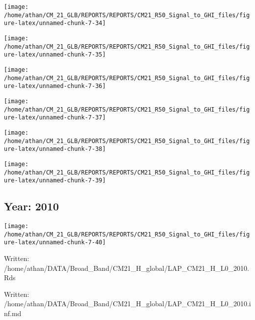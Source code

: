 \documentclass[
  11pt,
  a4paper,oneside]{article}
\begin{document}
\begin{center}\texttt{[image: /home/athan/CM\_21\_GLB/REPORTS/REPORTS/CM21\_R50\_Signal\_to\_GHI\_files/figure-latex/unnamed-chunk-7-34]} \end{center}

\begin{center}\texttt{[image: /home/athan/CM\_21\_GLB/REPORTS/REPORTS/CM21\_R50\_Signal\_to\_GHI\_files/figure-latex/unnamed-chunk-7-35]} \end{center}

\begin{center}\texttt{[image: /home/athan/CM\_21\_GLB/REPORTS/REPORTS/CM21\_R50\_Signal\_to\_GHI\_files/figure-latex/unnamed-chunk-7-36]} \end{center}

\begin{center}\texttt{[image: /home/athan/CM\_21\_GLB/REPORTS/REPORTS/CM21\_R50\_Signal\_to\_GHI\_files/figure-latex/unnamed-chunk-7-37]} \end{center}

\begin{center}\texttt{[image: /home/athan/CM\_21\_GLB/REPORTS/REPORTS/CM21\_R50\_Signal\_to\_GHI\_files/figure-latex/unnamed-chunk-7-38]} \end{center}

\begin{center}\texttt{[image: /home/athan/CM\_21\_GLB/REPORTS/REPORTS/CM21\_R50\_Signal\_to\_GHI\_files/figure-latex/unnamed-chunk-7-39]} \end{center}

\FloatBarrier

\newpage

\hypertarget{year-2010}{%
\subsection{Year: 2010}\label{year-2010}}

\begin{center}\texttt{[image: /home/athan/CM\_21\_GLB/REPORTS/REPORTS/CM21\_R50\_Signal\_to\_GHI\_files/figure-latex/unnamed-chunk-7-40]} \end{center}

Written: /home/athan/DATA/Broad\_Band/CM21\_H\_global/LAP\_CM21\_H\_L0\_2010.Rds

Written: /home/athan/DATA/Broad\_Band/CM21\_H\_global/LAP\_CM21\_H\_L0\_2010.inf.md
\end{document}
